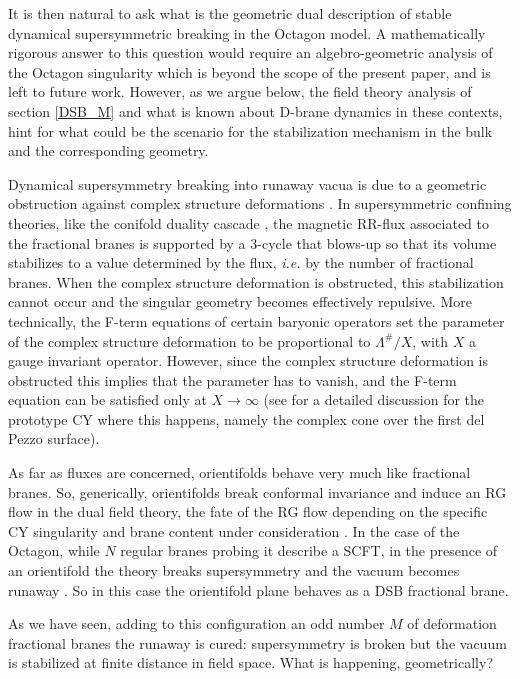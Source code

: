 \documentclass[a4paper,12pt]{article}
\begin{document}
{It is then natural to ask what is the geometric dual description of stable dynamical supersymmetric breaking in the Octagon model. A mathematically rigorous answer to this question would require an algebro-geometric analysis of the Octagon singularity which is beyond the scope of the present paper, and is left to future work. However, as we argue below, the field theory analysis of section \ref{DSB_M} and what is known about D-brane dynamics in these contexts, hint for what could be the scenario for the stabilization mechanism in the bulk and the corresponding geometry. 

Dynamical supersymmetry breaking into runaway vacua is due to a geometric obstruction against complex structure deformations \cite{Berenstein:2005xa,Franco:2005zu}. In supersymmetric confining theories, like the conifold duality cascade \cite{Klebanov:2000hb}, the magnetic RR-flux associated to the fractional branes is supported by a 3-cycle that blows-up so that its volume stabilizes to a value determined by the flux, {\it i.e.} by the number of fractional branes. When the complex structure deformation is obstructed, this stabilization cannot occur and the singular geometry becomes effectively repulsive. More technically, the F-term equations of certain baryonic operators set the parameter of the complex structure deformation to be proportional to $\Lambda^\#/X$, with $X$ a gauge invariant operator. However, since the complex structure deformation is obstructed this implies that the parameter has to vanish, and the F-term equation can be satisfied only at $X \rightarrow \infty$ (see \cite{Argurio:2007vq}  for a detailed discussion for the prototype CY where this happens, namely the complex cone over the first del Pezzo surface). 

As far as fluxes are concerned, orientifolds behave very much like fractional branes. 
So, generically, orientifolds break conformal invariance and induce an RG flow in the dual field theory, the fate of the RG flow depending on the specific CY singularity and brane content under consideration \cite{Argurio:2017upa,Antinucci:2020yki,Antinucci:2021edv,Amariti:2021lhk}. In the case of the Octagon, while $N$ regular branes probing it describe a SCFT, in the presence of an orientifold the theory breaks supersymmetry and the vacuum becomes runaway \cite{Argurio:2020dkg}. So in this case the orientifold plane behaves as a DSB fractional brane. 

As we have seen, adding to this configuration an odd number $M$ of deformation fractional branes  the runaway is cured: supersymmetry is broken but the vacuum is stabilized at finite distance in field space. What is happening, geometrically?

}
\end{document}
